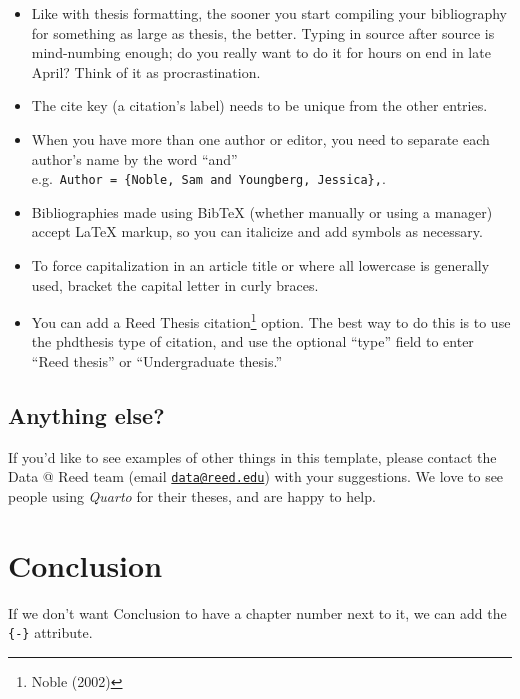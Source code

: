 \documentclass[
  letterpaper,
  12pt,
  twoside]{reedthesis}
\providecommand{\tightlist}{%
  \setlength{\itemsep}{0pt}\setlength{\parskip}{0pt}}
\begin{document}
\begin{itemize}
\tightlist
\item
  Like with thesis formatting, the sooner you start compiling your
  bibliography for something as large as thesis, the better. Typing in
  source after source is mind-numbing enough; do you really want to do
  it for hours on end in late April? Think of it as procrastination.
\item
  The cite key (a citation's label) needs to be unique from the other
  entries.
\item
  When you have more than one author or editor, you need to separate
  each author's name by the word ``and''
  e.g.~\texttt{Author\ =\ \{Noble,\ Sam\ and\ Youngberg,\ Jessica\},}.
\item
  Bibliographies made using BibTeX (whether manually or using a manager)
  accept LaTeX markup, so you can italicize and add symbols as
  necessary.
\item
  To force capitalization in an article title or where all lowercase is
  generally used, bracket the capital letter in curly braces.
\item
  You can add a Reed Thesis citation\footnote{Noble (2002)} option. The
  best way to do this is to use the phdthesis type of citation, and use
  the optional ``type'' field to enter ``Reed thesis'' or
  ``Undergraduate thesis.''
\end{itemize}

\section{Anything else?}\label{anything-else}

If you'd like to see examples of other things in this template, please
contact the Data @ Reed team (email
\href{mailto:data@reed.edu}{\nolinkurl{data@reed.edu}}) with your
suggestions. We love to see people using \emph{Quarto} for their theses,
and are happy to help.


\chapter*{Conclusion}\label{conclusion}


If we don't want Conclusion to have a chapter number next to it, we can
add the \texttt{\{-\}} attribute.
\end{document}
